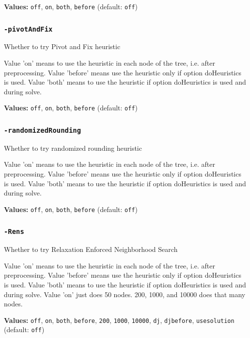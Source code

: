 \documentclass[11pt,a4paper]{article}
\begin{document}
\textbf{Values:} \texttt{off}, \texttt{on}, \texttt{both}, \texttt{before} (default: \texttt{off})

\subsubsection*{\texttt{-pivotAndFix}}

Whether to try Pivot and Fix heuristic

Value 'on' means to use the heuristic in each node of the tree, i.e. after preprocessing. Value 'before' means use the heuristic only if option doHeuristics is used. Value 'both' means to use the heuristic if option doHeuristics is used and during solve.

\textbf{Values:} \texttt{off}, \texttt{on}, \texttt{both}, \texttt{before} (default: \texttt{off})

\subsubsection*{\texttt{-randomizedRounding}}

Whether to try randomized rounding heuristic

Value 'on' means to use the heuristic in each node of the tree, i.e. after preprocessing. Value 'before' means use the heuristic only if option doHeuristics is used. Value 'both' means to use the heuristic if option doHeuristics is used and during solve.

\textbf{Values:} \texttt{off}, \texttt{on}, \texttt{both}, \texttt{before} (default: \texttt{off})

\subsubsection*{\texttt{-Rens}}

Whether to try Relaxation Enforced Neighborhood Search

Value 'on' means to use the heuristic in each node of the tree, i.e. after preprocessing. Value 'before' means use the heuristic only if option doHeuristics is used. Value 'both' means to use the heuristic if option doHeuristics is used and during solve. Value 'on' just does 50 nodes. 200, 1000, and 10000 does that many nodes.

\textbf{Values:} \texttt{off}, \texttt{on}, \texttt{both}, \texttt{before}, \texttt{200}, \texttt{1000}, \texttt{10000}, \texttt{dj}, \texttt{djbefore}, \texttt{usesolution} (default: \texttt{off})
\end{document}
